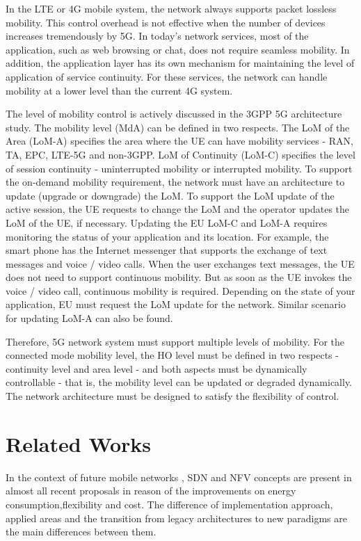 \documentclass[12pt]{article}
\begin{document}
In the LTE or 4G mobile system, the network always supports packet lossless mobility. This control overhead is not effective when the number of devices increases tremendously by 5G. In today's network services, most of the application, such as web browsing or chat, does not require seamless mobility. In addition, the application layer has its own mechanism for maintaining the level of application of service continuity. For these services, the network can handle mobility at a lower level than the current 4G system.

The level of mobility control is actively discussed in the 3GPP 5G architecture study. The mobility level (MdA) can be defined in two respects. The LoM of the Area (LoM-A) specifies the area where the UE can have mobility services - RAN, TA, EPC, LTE-5G and non-3GPP. LoM of Continuity (LoM-C) specifies the level of session continuity - uninterrupted mobility or interrupted mobility. To support the on-demand mobility requirement, the network must have an architecture to update (upgrade or downgrade) the LoM. To support the LoM update of the active session, the UE requests to change the LoM and the operator updates the LoM of the UE, if necessary. Updating the EU LoM-C and LoM-A requires monitoring the status of your application and its location. For example, the smart phone has the Internet messenger that supports the exchange of text messages and voice / video calls. When the user exchanges text messages, the UE does not need to support continuous mobility. But as soon as the UE invokes the voice / video call, continuous mobility is required. Depending on the state of your application, EU must request the LoM update for the network. Similar scenario for updating LoM-A can also be found.

Therefore, 5G network system must support multiple levels of mobility. For the connected mode mobility level, the HO level must be defined in two respects - continuity level and area level - and both aspects must be dynamically controllable - that is, the mobility level can be updated or degraded dynamically. The network architecture must be designed to satisfy the flexibility of control.

\section{Related Works}

In the context of future mobile networks , SDN and NFV concepts are present in almost all recent proposals in reason of the improvements on energy consumption,flexibility and cost. The difference of implementation approach, applied areas and the transition from legacy architectures to new paradigms are the main differences between them.
\end{document}
